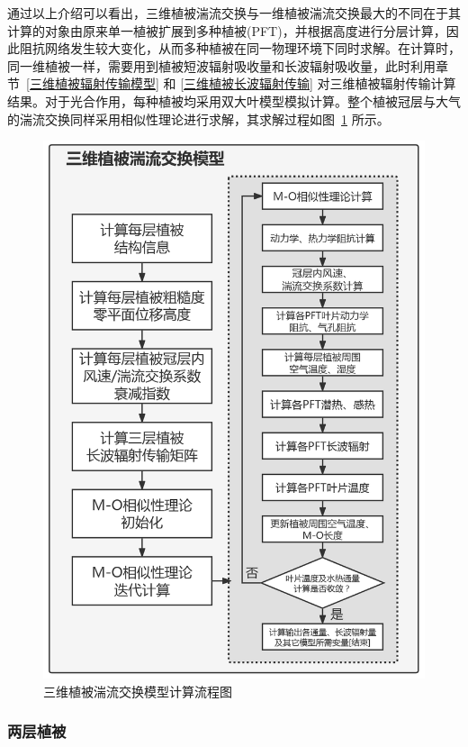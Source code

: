 通过以上介绍可以看出，三维植被湍流交换与一维植被湍流交换最大的不同在于其计算的对象由原来单一植被扩展到多种植被(PFT)，并根据高度进行分层计算，因此阻抗网络发生较大变化，从而多种植被在同一物理环境下同时求解。在计算时，同一维植被一样，需要用到植被短波辐射吸收量和长波辐射吸收量，此时利用章节~\ref{三维植被辐射传输模型} 和 \ref{三维植被长波辐射传输} 对三维植被辐射传输计算结果。对于光合作用，每种植被均采用双大叶模型模拟计算。整个植被冠层与大气的湍流交换同样采用相似性理论进行求解，其求解过程如图~\ref{fig:三维植被湍流交换模型计算流程图} 所示。
{
  \begin{figure}[htbp]
    \centering
    \includegraphics[width=0.75\linewidth]{Figures/地表湍流交换过程/三维植被湍流交换模型计算流程图_v2.png}
    \caption{三维植被湍流交换模型计算流程图}
    \label{fig:三维植被湍流交换模型计算流程图}
  \end{figure}
}


\subsubsection{两层植被}

